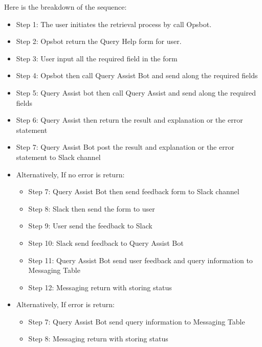     Here is the breakdown of the sequence:
    \begin{itemize}
        \item  Step 1: The user initiates the retrieval process by call Opsbot.
        \item  Step 2: Opsbot return the Query Help form for user.
        \item  Step 3: User input all the required field in the form
        \item  Step 4: Opsbot then call Query Assist Bot and send along the required fields
        \item  Step 5: Query Assist bot then call Query Assist and send along the required fields
        \item  Step 6: Query Assist then return the result and explanation or the error statement
        \item  Step 7: Query Assist Bot post the result and explanation or the error statement to Slack channel
        \item  Alternatively, If no error is return:
        \begin{itemize}
            \item Step 7: Query Assist Bot then send feedback form to Slack channel
            \item Step 8: Slack then send the form to user
            \item Step 9: User send the feedback to Slack
            \item Step 10: Slack send feedback to Query Assist Bot
            \item Step 11: Query Assist Bot send user feedback and query information to Messaging Table
            \item Step 12: Messaging return with storing status
        \end{itemize}
        \item  Alternatively, If error is return:
        \begin{itemize}
            \item Step 7: Query Assist Bot send query information to Messaging Table
            \item Step 8: Messaging return with storing status
        \end{itemize}
    \end{itemize}
